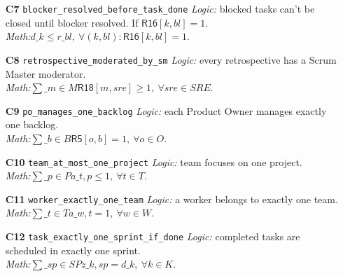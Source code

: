 \documentclass[11pt]{article}
\begin{document}
\begin{itemize}[leftmargin=2em]
  \item[\textbf{C7} \texttt{blocker\_resolved\_before\_task\_done}] \emph{Logic:} blocked tasks can't be closed until blocker resolved. If $\mathsf{R16}[k,bl]=1$. \\
  \emph{Math:}\quad $d\_k \le r\_{bl},\ \forall (k,bl):\mathsf{R16}[k,bl]=1.$

  \item[\textbf{C8} \texttt{retrospective\_moderated\_by\_sm}] \emph{Logic:} every retrospective has a Scrum Master moderator. \\
  \emph{Math:}\quad $\sum\_{m\in M}\mathsf{R18}[m,sre]\ge 1,\ \forall sre\in SRE.$

  \item[\textbf{C9} \texttt{po\_manages\_one\_backlog}] \emph{Logic:} each Product Owner manages exactly one backlog. \\
  \emph{Math:}\quad $\sum\_{b\in B}\mathsf{R5}[o,b]=1,\ \forall o\in O.$

  \item[\textbf{C10} \texttt{team\_at\_most\_one\_project}] \emph{Logic:} team focuses on one project. \\
  \emph{Math:}\quad $\sum\_{p\in P} a\_{t,p}\le 1,\ \forall t\in T.$

  \item[\textbf{C11} \texttt{worker\_exactly\_one\_team}] \emph{Logic:} a worker belongs to exactly one team. \\
  \emph{Math:}\quad $\sum\_{t\in T} a\_{w,t}=1,\ \forall w\in W.$

  \item[\textbf{C12} \texttt{task\_exactly\_one\_sprint\_if\_done}] \emph{Logic:} completed tasks are scheduled in exactly one sprint. \\
  \emph{Math:}\quad $\sum\_{sp\in SP} z\_{k,sp}= d\_k,\ \forall k\in K.$
\end{itemize}
\end{document}
